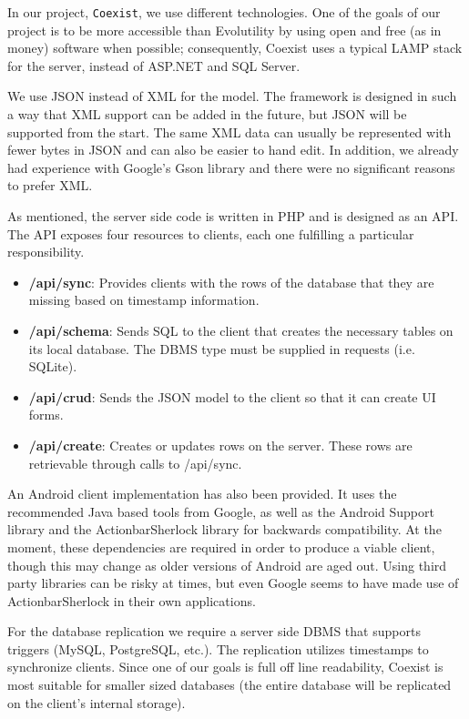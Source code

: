 In our project, \texttt{Coexist}, we use different technologies. One of
the goals of our project is to be more accessible than Evolutility by using open
and free (as in money) software when possible; consequently, Coexist uses a
typical LAMP stack for the server, instead of ASP.NET and SQL Server.

We use JSON instead of XML for the model. The framework is designed in such a
way that XML support can be added in the future, but JSON will be supported from
the start. The same XML data can usually be represented with fewer bytes in JSON
and can also be easier to hand edit. In addition, we already had experience with
Google's Gson library and there were no significant reasons to prefer XML.

As mentioned, the server side code is written in PHP and is designed as an API.
The API exposes four resources to clients, each one fulfilling a particular
responsibility.

\begin{itemize}
\item \textbf{/api/sync}: Provides clients with the rows of the database that they are missing based on timestamp information.
\item \textbf{/api/schema}: Sends SQL to the client that creates the necessary tables on its local database. The DBMS type must be supplied in requests (i.e. SQLite).
\item \textbf{/api/crud}: Sends the JSON model to the client so that it can create UI forms.
\item \textbf{/api/create}: Creates or updates rows on the server. These rows are retrievable through calls to /api/sync.
\end{itemize}

An Android client implementation has also been provided. It uses the recommended
Java based tools from Google, as well as the Android Support library and the
ActionbarSherlock library\cite{wharton_actionbarsherlock_????} for backwards
compatibility. At the moment, these dependencies are required in order to
produce a viable client, though this may change as older versions of Android are
aged out. Using third party libraries can be risky at times, but even Google
seems to have made use of ActionbarSherlock in their own
applications\cite{google_baseactivity.java_????}.

For the database replication we require a server side DBMS that supports
triggers (MySQL, PostgreSQL, etc.). The replication utilizes timestamps to
synchronize clients. Since one of our goals is full off line readability,
Coexist is most suitable for smaller sized databases (the entire database will
be replicated on the client's internal storage).


